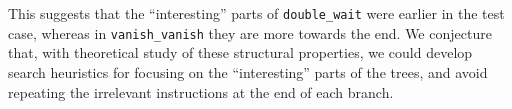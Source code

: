 This suggests that the ``interesting'' parts of \texttt{double\_wait} were earlier in the test case, whereas in \texttt{vanish\_vanish} they are more towards the end. We conjecture that, with theoretical study of these structural properties, we could develop search heuristics for focusing on the ``interesting'' parts of the trees, and avoid repeating the irrelevant instructions at the end of each branch.
